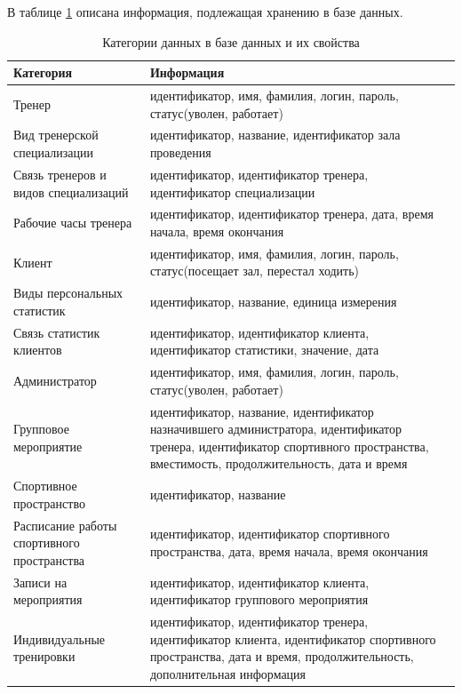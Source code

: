 В таблице \ref{tab:formaldb} описана информация, подлежащая хранению в базе данных.

\begin{table}[H]
	\centering
	\caption{Категории данных в базе данных и их свойства}
	\begin{tabular}{|p{6cm}|p{10cm}|}
	\hline
	Категория & Информация \\
	\hline
	Тренер & идентификатор, имя, фамилия, логин, пароль, статус(уволен, работает) \\
	\hline
    Вид тренерской специализации & идентификатор, название, идентификатор зала проведения \\
	\hline
	Связь тренеров и видов специализаций & идентификатор, идентификатор тренера, идентификатор специализации \\
	\hline
	Рабочие часы тренера & идентификатор, идентификатор тренера, дата, время начала, время окончания \\
	\hline
	Клиент & идентификатор, имя, фамилия, логин, пароль, статус(посещает зал, перестал ходить) \\
	\hline
	Виды персональных статистик & идентификатор, название, единица измерения \\
	\hline
	Связь статистик клиентов & идентификатор, идентификатор клиента, идентификатор статистики, значение, дата \\
	\hline
	Администратор & идентификатор, имя, фамилия, логин, пароль, статус(уволен, работает) \\
	\hline
	Групповое мероприятие & идентификатор, название, идентификатор назначившего администратора, идентификатор тренера, идентификатор спортивного пространства, вместимость, продолжительность, дата и время \\
	\hline
	Спортивное пространство & идентификатор, название \\
	\hline
	Расписание работы спортивного пространства & идентификатор, идентификатор спортивного пространства, дата, время начала, время окончания \\
	\hline
	Записи на мероприятия & идентификатор, идентификатор клиента, идентификатор группового мероприятия \\
	\hline
	Индивидуальные тренировки & идентификатор, идентификатор тренера, идентификатор клиента, идентификатор спортивного пространства, дата и время, продолжительность, дополнительная информация \\
	\hline
	\end{tabular}
	\label{tab:formaldb}
\end{table}

